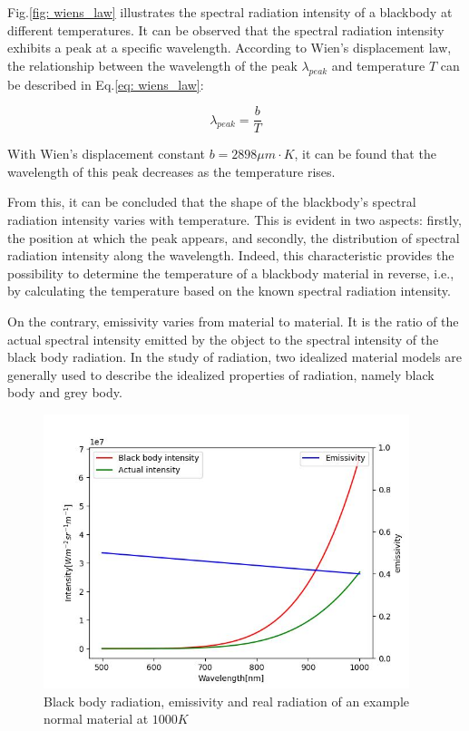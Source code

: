 Fig.\ref{fig: wiens_law} illustrates the spectral radiation intensity 
of a blackbody at different temperatures. It can be observed that the 
spectral radiation intensity exhibits a peak at a specific wavelength. 
According to Wien's displacement law, the relationship between the wavelength
of the peak $\lambda_{peak}$ and temperature $T$ can be described in Eq.\ref{eq: wiens_law}:

\begin{equation}
    \label{eq: wiens_law}
    \lambda_{peak} = \frac{b}{T}
\end{equation}


With Wien's displacement constant $b = 2898 \mu m \cdot K$, it can be found 
that the wavelength of this peak decreases as the temperature rises.


From this, it can be concluded that the shape of the blackbody's 
spectral radiation intensity varies with temperature. This is evident 
in two aspects: firstly, the position at which the peak appears, and 
secondly, the distribution of spectral radiation intensity along the 
wavelength. Indeed, this characteristic provides the possibility to 
determine the temperature of a blackbody material in reverse, 
i.e., by calculating the temperature based on the known spectral 
radiation intensity.


On the contrary, emissivity varies from material to material. It is the 
ratio of the actual spectral intensity emitted by the object to the spectral 
intensity of the black body radiation. In the study of radiation, two idealized 
material models are generally used to describe the idealized 
properties of radiation, namely black body and grey body. 


\begin{figure}[htbp]
    \centering
    \includegraphics[width = 0.95\textwidth]{figures/real_radiation.jpg}
    \caption{Black body radiation, emissivity and real radiation of an example normal
    material at $1000K$}
    \label{fig: black_body_radiation}
\end{figure}

